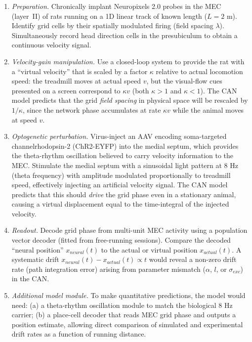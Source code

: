 \documentclass[11pt, a4paper]{article}
\begin{document}
\begin{enumerate}
    \item \textit{Preparation.} Chronically implant Neuropixels 2.0 probes in the MEC (layer~II)
    of rats running on a 1D linear track of known length ($L=2$ m). Identify grid cells by
    their spatially modulated firing (field spacing $\lambda$). Simultaneously record head
    direction cells in the presubiculum to obtain a continuous velocity signal.

    \item \textit{Velocity-gain manipulation.} Use a closed-loop system to provide the rat
    with a ``virtual velocity'' that is scaled by a factor $\kappa$ relative to actual locomotion
    speed: the treadmill moves at actual speed $v$, but the visual-flow cues presented on a
    screen correspond to $\kappa v$ (both $\kappa > 1$ and $\kappa < 1$). The CAN model predicts
    that the grid \emph{field spacing} in physical space will be rescaled by $1/\kappa$, since
    the network phase accumulates at rate $\kappa v$ while the animal moves at speed $v$.

    \item \textit{Optogenetic perturbation.} Virus-inject an AAV encoding soma-targeted
    channelrhodopsin-2 (ChR2-EYFP) into the medial septum, which provides the theta-rhythm
    oscillation believed to carry velocity information to the MEC. Stimulate the medial septum
    with a sinusoidal light pattern at $8$ Hz (theta frequency) with amplitude modulated
    proportionally to treadmill speed, effectively injecting an artificial velocity signal.
    The CAN model predicts that this should \emph{drive} the grid phase even in a stationary
    animal, causing a virtual displacement equal to the time-integral of the injected velocity.

    \item \textit{Readout.} Decode grid phase from multi-unit MEC activity using a
    population vector decoder (fitted from free-running sessions). Compare the decoded
    ``neural position'' $x_{neural}(t)$ to the actual or virtual position $x_{actual}(t)$.
    A systematic drift $x_{neural}(t) - x_{actual}(t) \propto t$ would reveal a non-zero
    drift rate (path integration error) arising from parameter mismatch ($\alpha$, $l$, or
    $\sigma_{exc}$) in the CAN.

    \item \textit{Additional model module.} To make quantitative predictions, the model would
    need: (a) a theta-rhythm oscillation module to match the biological 8 Hz carrier; (b) a
    place-cell decoder that reads MEC grid phase and outputs a position estimate, allowing
    direct comparison of simulated and experimental drift rates as a function of running
    distance.
\end{enumerate}
\end{document}
